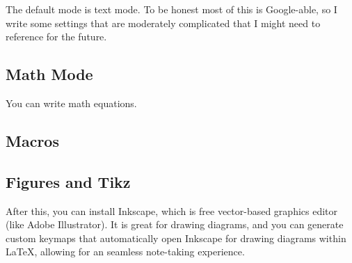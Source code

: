   The default mode is text mode. To be honest most of this is Google-able, so I write some settings that are moderately complicated that I might need to reference for the future. 

\subsection{Math Mode} 

  You can write math equations. 

\subsection{Macros}

\subsection{Figures and Tikz}

  After this, you can install Inkscape, which is free vector-based graphics editor (like Adobe Illustrator). It is great for drawing diagrams, and you can generate custom keymaps that automatically open Inkscape for drawing diagrams within LaTeX, allowing for an seamless note-taking experience.  


